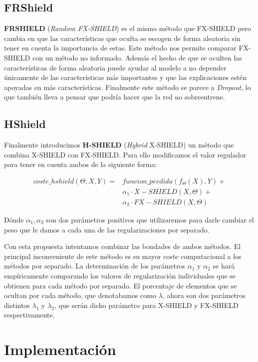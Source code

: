 \subsection{FRShield}

\textbf{FRSHIELD} (\textit{Random FX-SHIELD}) es el mismo método que FX-SHIELD pero cambia en que las características que oculta se escogen de forma aleatoria sin tener en cuenta la importancia de estas. Este método nos permite comparar FX-SHIELD con un método no informado. Además el hecho de que se oculten las características de forma aleatoria puede ayudar al modelo a no depender únicamente de las características más importantes y que las explicaciones estén apoyadas en más características. Finalmente este método se parece a \textit{Dropout}, lo que también lleva a pensar que podría hacer que la red no sobreentrene.

\subsection{HShield}

Finalmente introducimos \textbf{H-SHIELD} (\textit{Hybrid} X-SHIELD) un método que combina X-SHIELD con FX-SHIELD. Para ello modificamos el valor regulador para tener en cuenta ambos de la siguiente forma:

\begin{align*}
coste\_hshield(\Theta,X,Y) = &funcion\_perdida(f_\Theta(X),Y) + \\
&\alpha_1 \cdot X-SHIELD(X,\Theta) +\\
&\alpha_2 \cdot FX-SHIELD(X,\Theta)
\end{align*}

Dónde $\alpha_1, \alpha_2$ son dos parámetros positivos que utilizaremos para darle cambiar el peso que le damos a cada una de las regularizaciones por separado. 

Con esta propuesta intentamos combinar las bondades de ambos métodos. El principal inconveniente de este método es su mayor coste computacional a los métodos por separado. La determinación de los parámetros $\alpha_1$ y $\alpha_2$ se hará empíricamente comparando los valores de regularización individuales que se obtienen para cada método por separado. El porcentaje de elementos que se ocultan por cada método, que denotabamos como $\lambda$, ahora son dos parámetros distintos $\lambda_1$ y $\lambda_2$, que serán dicho parámetro para X-SHIELD y FX-SHIELD respectivamente.

\section{Implementación}

